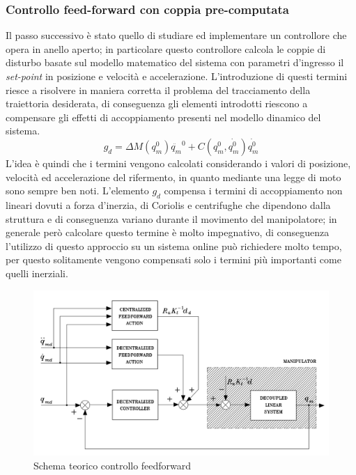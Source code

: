 \subsubsection{Controllo feed-forward con coppia pre-computata}
Il passo successivo è stato quello di studiare ed implementare un controllore che opera in anello aperto; in particolare questo controllore calcola le coppie di disturbo basate sul modello matematico del sistema con parametri d'ingresso il \textit{set-point} in posizione e velocità e accelerazione. L'introduzione di questi termini riesce a risolvere in maniera corretta il problema del tracciamento della traiettoria desiderata, di conseguenza gli elementi introdotti riescono a compensare gli effetti di accoppiamento presenti nel modello dinamico del sistema. 
\begin{equation}
g_d = \Delta M(q^0_m)\ddot{q_m}^0 + C(q^0_m,\dot{q_m^0})\dot{q_m^0}
\end{equation}
L'idea è quindi che i termini vengono calcolati considerando i valori di posizione, velocità ed accelerazione del rifermento, in quanto mediante una legge di moto sono sempre ben noti. L'elemento $g_d$ compensa i termini di accoppiamento non lineari dovuti a forza d'inerzia, di Coriolis e centrifughe che dipendono dalla struttura e di conseguenza variano durante il movimento del manipolatore; in generale però calcolare questo termine è molto impegnativo, di conseguenza l'utilizzo di questo approccio su un sistema online può richiedere molto tempo, per questo solitamente vengono compensati solo i termini più importanti come quelli inerziali.
\begin{figure}[ht]
	\begin{center}
		\includegraphics[scale=0.5]{Immagini/Controllori/FFschema}
		\caption{Schema teorico controllo feedforward}
		\label{fig:FFschema}
	\end{center}
\end{figure}
